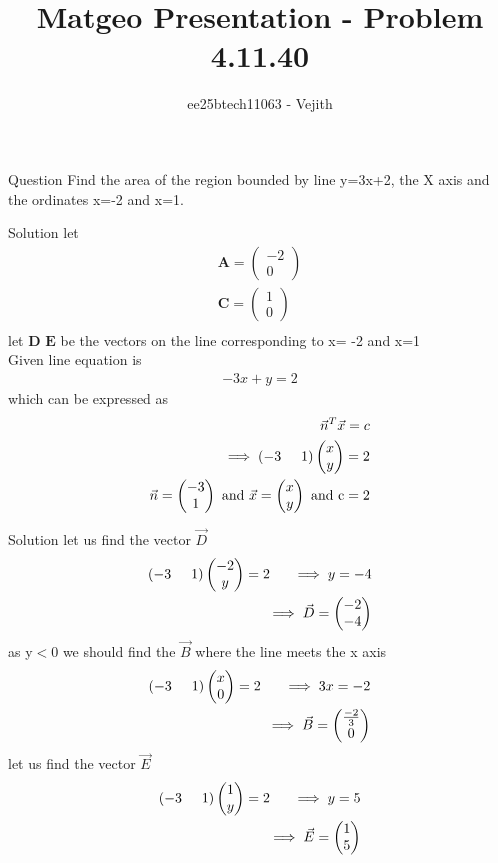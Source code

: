 \documentclass{beamer}
\title{Matgeo Presentation - Problem 4.11.40}
\author{ee25btech11063 - Vejith}
\numberwithin{equation}{section}
\providecommand{\brak}[1]{\ensuremath{\left(#1\right)}}
\theoremstyle{remark}
\newcommand{\myvec}[1]{\ensuremath{\begin{pmatrix}#1\end{pmatrix}}}
\let\vec\mathbf
\begin{document}
\frame{\titlepage}
\begin{frame}{Question}
Find the area of the region bounded by line y=3x+2, the X axis and the ordinates x=-2 and x=1.
\end{frame}

\begin{frame}{Solution}
   let
\begin{align}
    \vec{A}=\myvec{-2\\0}\\
    \vec{C}=\myvec{1\\0}\\
    \end{align}
let $\vec{D}$  $\vec{E}$ be the vectors on the line corresponding to x= -2 and x=1\\

Given line equation is 
\begin{align}
    -3x+y=2
\end{align}
 which can be expressed as
 \begin{align}
     \Vec{n}^T\Vec{x}=c\\
     \implies \brak{-3\hspace{0.5cm}1}\myvec{x\\y}=2\\
     \Vec{n}=\myvec{-3\\1} \text{ and } \Vec{x}=\myvec{x\\y} \text{ and c}=2
\end{align}
\end{frame}

\begin{frame}{Solution}
    let us find the vector $\Vec{D}$
\begin{align}
    \brak{-3\hspace{0.5cm}1}\myvec{-2\\y}=2 \hspace{0.5cm} \implies y=-4\\
    \implies \Vec{D}= \myvec{-2\\-4}
\end{align}
as y$<$0 we should find the $\Vec{B}$ where the line meets the x axis 
\begin{align}
    \brak{-3\hspace{0.5cm}1}\myvec{x\\0}=2 \hspace{0.5cm} \implies3x=-2\\
    \implies \Vec{B}= \myvec{\frac{-2}{3}\\0}
    \end{align}
    let us find the vector $\Vec{E}$
    \begin{align}
    \brak{-3\hspace{0.5cm}1}\myvec{1\\y}=2 \hspace{0.5cm} \implies y=5\\
    \implies \Vec{E}= \myvec{1\\5}
\end{align}
\end{frame}
\end{document}
